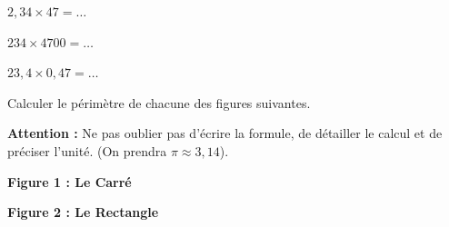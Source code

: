 \documentclass[a4paper]{book}
\begin{document}
{\begin{exercice}
\begin{enumerate}
            \begin{minipage}{0.33\linewidth}
                $2,34 \times 47 = \dots$
            \end{minipage}
            \hfill\vline\hfill
            \begin{minipage}{0.33\linewidth}
                \quad $234 \times 4700 = \dots$
            \end{minipage}        
            \hfill\vline\hfill
            \begin{minipage}{0.33\linewidth}
                $23,4 \times 0,47 = \dots$
            \end{minipage}
        \end{enumerate}
    \end{exercice}


    \begin{exercice}
        Calculer le périmètre de chacune des figures suivantes.
        
        \textbf{Attention :} Ne pas oublier pas d'écrire la formule, de détailler le calcul et de préciser l'unité. (On prendra $\pi \approx 3,14$).

        \medskip

        \begin{minipage}{0.33\linewidth}
            \centering
            \textbf{Figure 1 : Le Carré} \\
            \vspace{0.3cm}
            
            \medskip
            
            \dotfill 
        \end{minipage}
        \hfill\vline\hfill
        \begin{minipage}{0.33\linewidth}
            \centering
            \textbf{Figure 2 : Le Rectangle} \\
            \vspace{0.3cm}

            \bigskip
            

\end{minipage}
\end{exercice}}
\end{document}
